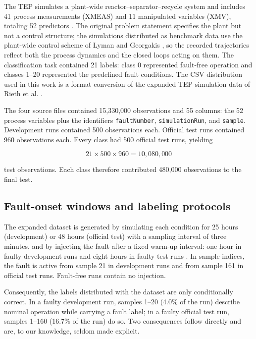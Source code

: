\documentclass[10pt,twocolumn,a4paper]{article}
\begin{document}
The TEP simulates a plant-wide reactor--separator--recycle system and includes
41 process measurements (XMEAS) and 11 manipulated variables (XMV), totaling 52
predictors \cite{downs1993tep}. The original problem statement specifies the
plant but not a control structure; the simulations distributed as benchmark
data use the plant-wide control scheme of Lyman and Georgakis
\cite{lyman1995control}, so the recorded trajectories reflect both the process
dynamics and the closed loops acting on them. The classification task contained
21 labels:
class 0 represented fault-free operation and classes 1--20 represented the
predefined fault conditions. The CSV distribution used in this work is a format
conversion of the expanded TEP simulation data of Rieth et al.
\cite{rieth2017data,kaggleTEP}.

The four source files contained 15,330,000 observations and 55 columns: the 52
process variables plus the identifiers \texttt{faultNumber},
\texttt{simulationRun}, and \texttt{sample}. Development runs contained 500
observations each. Official test runs contained 960 observations each. Every
class had 500 official test runs, yielding

\begin{equation}
21\times 500\times 960=10{,}080{,}000
\end{equation}

\noindent test observations. Each class therefore contributed 480,000 observations to
the final test.

\subsection{Fault-onset windows and labeling protocols}
\label{sec:onset}

The expanded dataset is generated by simulating each condition for 25 hours
(development) or 48 hours (official test) with a sampling interval of three
minutes, and by injecting the fault after a fixed warm-up interval: one hour in
faulty development runs and eight hours in faulty test runs
\cite{rieth2017data,rieth2018issues,reinartz2021extended}. In sample indices,
the fault is active from sample 21 in development runs and from sample 161 in
official test runs. Fault-free runs contain no injection.

Consequently, the labels distributed with the dataset are only conditionally
correct. In a faulty development run, samples 1--20 (4.0\% of the run) describe
nominal operation while carrying a fault label; in a faulty official test run,
samples 1--160 (16.7\% of the run) do so. Two consequences follow directly and
are, to our knowledge, seldom made explicit.
\end{document}
